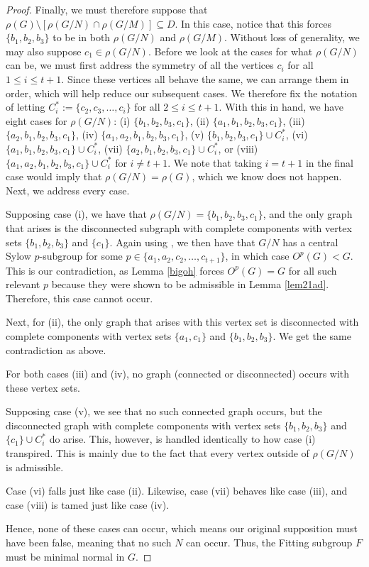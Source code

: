 \documentclass[10pt,a4paper]{amsart}
\begin{document}
\begin{proof}
Finally, we must therefore suppose that $\rho(G)\setminus[\rho(G/N)\cap\rho(G/M)]\subseteq D$. In this case, notice that this forces $\{b_1,b_2,b_3\}$ to be in both $\rho(G/N)$ and $\rho(G/M)$. Without loss of generality, we may also suppose $c_1\in\rho(G/N)$. Before we look at the cases for what $\rho(G/N)$ can be, we must first address the symmetry of all the vertices $c_i$ for all $1\leq i\leq t+1$. Since these vertices all behave the same, we can arrange them in order, which will help reduce our subsequent cases. We therefore fix the notation of letting $C_i^*:=\{c_2,c_3,\ldots,c_i\}$ for all $2\leq i\leq t+1$. With this in hand, we have eight cases for $\rho(G/N)$: (i) $\{b_1,b_2,b_3,c_1\}$, (ii) $\{a_1,b_1,b_2,b_3,c_1\}$, (iii) $\{a_2,b_1,b_2,b_3,c_1\}$, (iv) $\{a_1,a_2,b_1,b_2,b_3,c_1\}$, (v) $\{b_1,b_2,b_3,c_1\}\cup C_i^*$, (vi) $\{a_1,b_1,b_2,b_3,c_1\}\cup C_i^*$, (vii) $\{a_2,b_1,b_2,b_3,c_1\}\cup C_i^*$, or (viii) $\{a_1,a_2,b_1,b_2,b_3,c_1\}\cup C_i^*$ for $i\neq t+1$. We note that taking $i=t+1$ in the final case would imply that $\rho(G/N)=\rho(G)$, which we know does not happen. Next, we address every case.

Supposing case (i), we have that $\rho(G/N)=\{b_1,b_2,b_3,c_1\}$, and the only graph that arises is the disconnected subgraph with complete components with vertex sets $\{b_1,b_2,b_3\}$ and $\{c_1\}$. Again using \cite{L}, we then have that $G/N$ has a central Sylow $p$-subgroup for some $p\in\{a_1,a_2,c_2,\ldots,c_{t+1}\}$, in which case $O^p(G)<G$. This is our contradiction, as Lemma \ref{bigoh} forces $O^p(G)=G$ for all such relevant $p$ because they were shown to be admissible in Lemma \ref{lem21ad}. Therefore, this case cannot occur.

Next, for (ii), the only graph that arises with this vertex set is disconnected with complete components with vertex sets $\{a_1,c_1\}$ and $\{b_1,b_2,b_3\}$. We get the same contradiction as above.

For both cases (iii) and (iv), no graph (connected or disconnected) occurs with these vertex sets.

Supposing case (v), we see that no such connected graph occurs, but the disconnected graph with complete components with vertex sets $\{b_1,b_2,b_3\}$ and $\{c_1\}\cup C_i^*$ do arise. This, however, is handled identically to how case (i) transpired. This is mainly due to the fact that every vertex outside of $\rho(G/N)$ is admissible.

Case (vi) falls just like case (ii). Likewise, case (vii) behaves like case (iii), and case (viii) is tamed just like case (iv).

Hence, none of these cases can occur, which means our original supposition must have been false, meaning that no such $N$ can occur. Thus, the Fitting subgroup $F$ must be minimal normal in $G$.
\end{proof}
\end{document}
